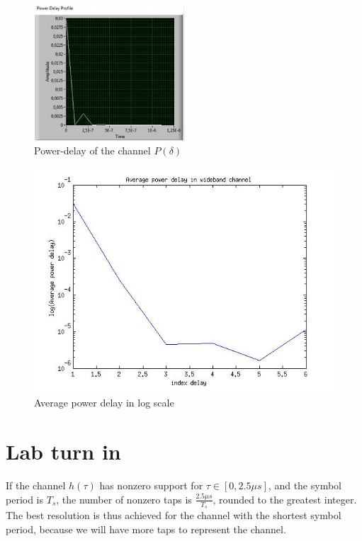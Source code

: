 \documentclass{article}
\begin{document}
     \begin{figure}[h!]
        \centering
        \includegraphics[width=0.5\textwidth]{powerdelay.png}
        \caption{Power-delay of the channel $P(\delta)$ \label{delay}}
     \end{figure}
    \begin{figure}[h!]
        \centering
        \includegraphics[width = 0.7 \textwidth]{average.jpg}
        \caption{Average power delay in log scale \label{av}}
    \end{figure}

\section{Lab turn in}
If the channel $h(\tau)$ has nonzero support for $\tau \in [0,2.5\mu s]$, and the symbol period is $T_s$, the number of nonzero taps is $\frac{2.5\mu s}{T_s}$, rounded to the greatest integer. The best resolution is thus achieved for the channel with the shortest symbol period, because we will have more taps to represent the channel.
\end{document}
